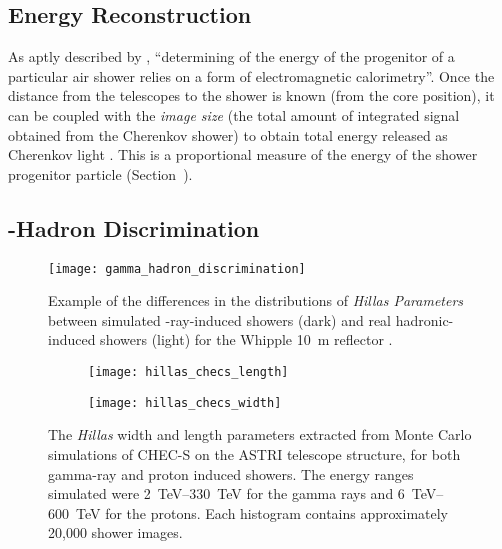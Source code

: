 \subsection{Energy Reconstruction}

As aptly described by \textcite[][p.~16]{Dickinson2010}, ``determining of the energy of the progenitor of a particular air shower relies on a form of electromagnetic calorimetry''. Once the distance from the telescopes to the shower is known (from the core position), it can be coupled with the \textit{image size} (the total amount of integrated signal obtained from the Cherenkov shower) to obtain total energy released as Cherenkov light \cite{Cogan2006,Bernlohr2013a}. This is a proportional measure of the energy of the shower progenitor particle (Section~).

\subsection{\textgamma-Hadron Discrimination}

\begin{figure}
	\centering
    \texttt{[image: gamma\_hadron\_discrimination]} 
	\caption[Discriminating between images of gamma-ray and hadron induced showers.]{Example of the differences in the distributions of \textit{Hillas Parameters} between simulated \textgamma-ray-induced showers (dark) and real hadronic-induced showers (light) for the Whipple \SI{10}{m} reflector \cite{Fegan1999a}.}
	\label{fig:gamma_hadron_discrimination}
\end{figure}

\begin{figure}
  \begin{subfigure}[b]{0.49\textwidth}
    \texttt{[image: hillas\_checs\_length]}
    \caption{}
    \label{fig:hillas_checs_length}
  \end{subfigure}
  \hfill
  \begin{subfigure}[b]{0.49\textwidth}
    \texttt{[image: hillas\_checs\_width]}
    \caption{}
    \label{fig:hillas_checs_width}
  \end{subfigure}
  \caption[Hillas width and length from CHEC-S simulations.]{The \textit{Hillas} width and length parameters extracted from Monte Carlo simulations of CHEC-S on the ASTRI telescope structure, for both gamma-ray and proton induced showers. The energy ranges simulated were \SIrange{2}{330}{TeV} for the gamma rays and \SIrange{6}{600}{TeV} for the protons. Each histogram contains approximately 20,000 shower images.}
    \label{fig:hillas_checs}
\end{figure}

